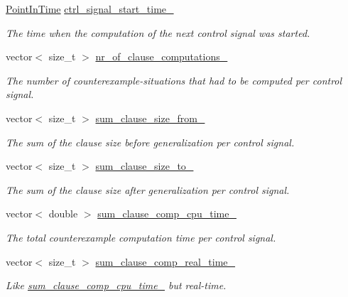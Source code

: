 \begin{DoxyCompactItemize}
\hyperlink{Stopwatch_8h_af3a9f634f27bed7e98dbc23e5c6f807d}{Point\-In\-Time} \hyperlink{classLearningExtractorStatistics_aaf7283a491c91200e03e0ca29f7bcd93}{ctrl\-\_\-signal\-\_\-start\-\_\-time\-\_\-}
\begin{DoxyCompactList}\small\item\em The time when the computation of the next control signal was started. \end{DoxyCompactList}\item 
vector$<$ size\-\_\-t $>$ \hyperlink{classLearningExtractorStatistics_a20b2771dd74bd0e2e08d7568149bef14}{nr\-\_\-of\-\_\-clause\-\_\-computations\-\_\-}
\begin{DoxyCompactList}\small\item\em The number of counterexample-\/situations that had to be computed per control signal. \end{DoxyCompactList}\item 
vector$<$ size\-\_\-t $>$ \hyperlink{classLearningExtractorStatistics_a2a7ac5da4b46b9366430f6934579ade7}{sum\-\_\-clause\-\_\-size\-\_\-from\-\_\-}
\begin{DoxyCompactList}\small\item\em The sum of the clause size before generalization per control signal. \end{DoxyCompactList}\item 
vector$<$ size\-\_\-t $>$ \hyperlink{classLearningExtractorStatistics_ac503db6146780edd0fd6316777d251cf}{sum\-\_\-clause\-\_\-size\-\_\-to\-\_\-}
\begin{DoxyCompactList}\small\item\em The sum of the clause size after generalization per control signal. \end{DoxyCompactList}\item 
vector$<$ double $>$ \hyperlink{classLearningExtractorStatistics_a3e3c198d4480eb0b74410126bc2040e9}{sum\-\_\-clause\-\_\-comp\-\_\-cpu\-\_\-time\-\_\-}
\begin{DoxyCompactList}\small\item\em The total counterexample computation time per control signal. \end{DoxyCompactList}\item 
vector$<$ size\-\_\-t $>$ \hyperlink{classLearningExtractorStatistics_a505c22ba13094231793f0d5aeaf362f6}{sum\-\_\-clause\-\_\-comp\-\_\-real\-\_\-time\-\_\-}
\begin{DoxyCompactList}\small\item\em Like \hyperlink{classLearningExtractorStatistics_a3e3c198d4480eb0b74410126bc2040e9}{sum\-\_\-clause\-\_\-comp\-\_\-cpu\-\_\-time\-\_\-} but real-\/time. \end{DoxyCompactList}\item 

\end{DoxyCompactItemize}
